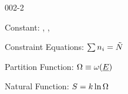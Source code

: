 \begin{mitframe}{002-2} %

    
\begin{listone}
    
    \item Constant: \nummoles, \uline{\vol}, \uline{\energy}
    
    \item Constraint Equations: $\sum\nolimits \molspecies{i} = \totmoles$     %
           
    \item Partition Function: $\mpc \equiv \mpf(\uline{\energy})$
           
    \item Natural Function: $\entropy = \thermcond\ln\mpc$
    
\end{listone}			

\end{mitframe}